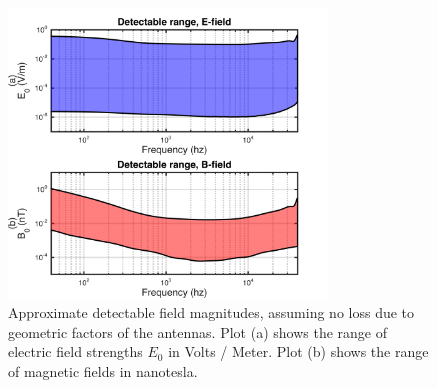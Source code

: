 \begin{figure}[t]
\begin{center}
\includegraphics[width=20pc]{figures/vpm_figures/detectable_ranges.png}

\caption[Approximate detectable field magnitudes]{Approximate detectable field magnitudes, assuming no loss due to geometric factors of the antennas. Plot (a) shows the range of electric field strengths $E_0$ in Volts / Meter. Plot (b) shows the range of magnetic fields in nanotesla.}
\label{fig:detectable_ranges}
\end{center}
\end{figure}


